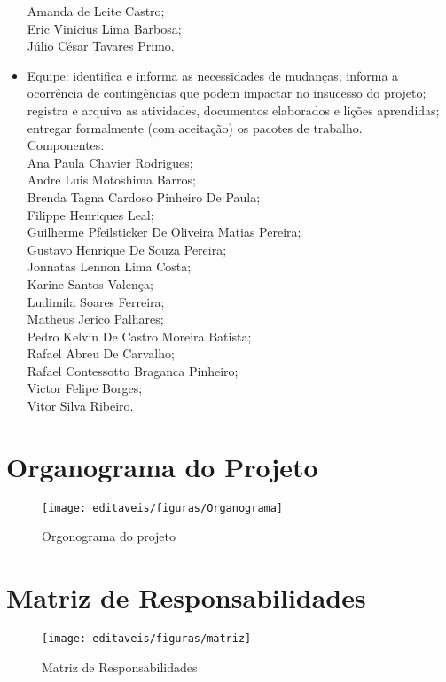 \begin{itemize}
  Amanda de Leite Castro;\\
  Eric Vinicius Lima Barbosa;\\
  Júlio César Tavares Primo.\\
  \item Equipe: identifica e informa as necessidades de mudanças; informa a ocorrência de contingências que podem impactar no insucesso do projeto; registra e arquiva as atividades, documentos elaborados e lições aprendidas; entregar formalmente (com aceitação) os pacotes de trabalho.\\
Componentes:\\
Ana Paula Chavier Rodrigues;\\
Andre Luis Motoshima Barros;\\
Brenda Tagna Cardoso Pinheiro De Paula;\\
Filippe Henriques Leal;\\
Guilherme Pfeilsticker De Oliveira Matias Pereira;\\
Gustavo Henrique De Souza Pereira;\\
Jonnatas Lennon Lima Costa;\\
Karine Santos Valença;\\
Ludimila Soares Ferreira;\\
Matheus Jerico Palhares;\\
Pedro Kelvin De Castro Moreira Batista;\\
Rafael Abreu De Carvalho;\\
Rafael Contessotto Braganca Pinheiro;\\
Victor Felipe Borges;\\
Vitor Silva Ribeiro.\\
  \end{itemize}
\newpage
\section*{Organograma do Projeto}
  \begin{figure}[!ht]
\centering
\texttt{[image: editaveis/figuras/Organograma]}
\caption{Orgonograma do projeto}
\label{Rotulo}
\end{figure}
\FloatBarrier

 \section*{Matriz de Responsabilidades}
 \FloatBarrier
 \begin{figure}[h]
\texttt{[image: editaveis/figuras/matriz]}
\label{matrizderesponsabilidades}
\caption{Matriz de Responsabilidades}
 \end{figure}

